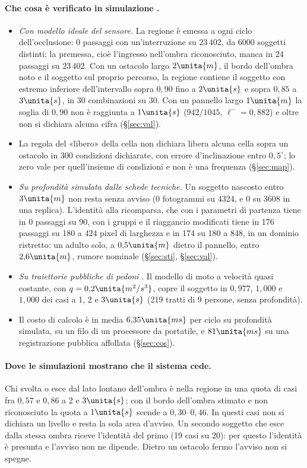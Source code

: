 \paragraph{Che cosa è verificato in simulazione .}
\begin{itemize}
\item \emph{Con modello ideale del sensore.} La regione è emessa a ogni ciclo dell'occlusione: 0 passaggi con un'interruzione su $23\,402$, da 6000 soggetti distinti; la premessa, cioè l'ingresso nell'ombra riconosciuto, manca in 24 passaggi su $23\,402$. Con un ostacolo largo $2\unita{m}$, il bordo dell'ombra noto e il soggetto sul proprio percorso, la regione contiene il soggetto con estremo inferiore dell'intervallo sopra $0{,}90$ fino a $2\unita{s}$ e sopra $0{,}85$ a $3\unita{s}$, in 30 combinazioni su 30. Con un pannello largo $1\unita{m}$ la soglia di $0{,}90$ non è raggiunta a $1\unita{s}$ ($942/1045$, $\ell^-=0{,}882$) e oltre non si dichiara alcuna cifra (\S\ref{sec:val}).
\item La regola del «libero» della cella non dichiara libera alcuna cella sopra un ostacolo in 300 condizioni dichiarate, con errore d'inclinazione entro $0{,}5^\circ$; lo zero vale per quell'insieme di condizioni e non è una frequenza (\S\ref{sec:map}).
\item \emph{Su profondità simulata dalle schede tecniche.} Un soggetto nascosto entro $3\unita{m}$ non resta senza avviso (0 fotogrammi su 4324, e 0 su 3608 in una replica). L'identità alla ricomparsa, che con i parametri di partenza tiene in 0 passaggi su 90, con i gruppi e il riaggancio modificati tiene in 176 passaggi su 180 a 424 pixel di larghezza e in 174 su 180 a 848, in un dominio ristretto: un adulto solo, a $0{,}5\unita{m}$ dietro il pannello, entro $2{,}6\unita{m}$, rumore nominale (\S\ref{sec:sti}, \S\ref{sec:val}).
\item \emph{Su traiettorie pubbliche di pedoni} . Il modello di moto a velocità quasi costante, con $q=0{,}2\unita{m^2/s^3}$, copre il soggetto in $0{,}977$, $1{,}000$ e $1{,}000$ dei casi a 1, 2 e $3\unita{s}$ (219 tratti di 9 persone, senza profondità).
\item Il costo di calcolo è in media $6{,}35\unita{ms}$ per ciclo su profondità simulata, su un filo di un processore da portatile, e $81\unita{ms}$ su una registrazione pubblica affollata (\S\ref{sec:cos}).
\end{itemize}

\paragraph{Dove le simulazioni mostrano che il sistema cede.} Chi svolta o esce dal lato lontano dell'ombra è nella regione in una quota di casi fra $0{,}57$ e $0{,}86$ a 2 e $3\unita{s}$; con il bordo dell'ombra stimato e non riconosciuto la quota a $1\unita{s}$ scende a $0{,}30$--$0{,}46$. In questi casi non si dichiara un livello e resta la sola area d'avviso. Un secondo soggetto che esce dalla stessa ombra riceve l'identità del primo (19 casi su 20): per questo l'identità è presunta e l'avviso non ne dipende. Dietro un ostacolo fermo l'avviso non si spegne.

